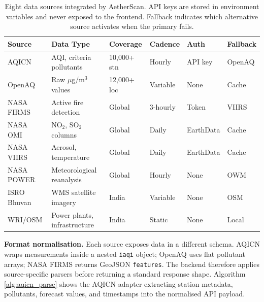 \documentclass[12pt,a4paper]{article}
\begin{document}
\begin{table}[H]
\centering
\caption[Integrated data sources and operational characteristics]{%
Eight data sources integrated by AetherScan. API keys are stored in
environment variables and never exposed to the frontend. Fallback indicates
which alternative source activates when the primary fails.}
\label{tab:datasources}
\setlength{\tabcolsep}{4pt}
\begin{tabularx}{\textwidth}{@{}lXllll@{}}
\toprule
\textbf{Source} & \textbf{Data Type} & \textbf{Coverage} &
\textbf{Cadence} & \textbf{Auth} & \textbf{Fallback} \\
\midrule
AQICN       & AQI, criteria pollutants  & 10,000+ stn & Hourly   & API key & OpenAQ \\
OpenAQ      & Raw $\mu$g/m$^3$ values   & 12,000+ loc & Variable & None    & Cache  \\
NASA FIRMS  & Active fire detection     & Global      & 3-hourly & Token   & VIIRS  \\
NASA OMI    & NO$_2$, SO$_2$ columns    & Global      & Daily    & EarthData & Cache \\
NASA VIIRS  & Aerosol, temperature      & Global      & Daily    & EarthData & Cache \\
NASA POWER  & Meteorological reanalysis & Global      & Hourly   & None    & OWM   \\
ISRO Bhuvan & WMS satellite imagery     & India       & Variable & None    & OSM   \\
WRI/OSM     & Power plants, infrastructure & India    & Static   & None    & Local \\
\bottomrule
\end{tabularx}
\end{table}

\noindent\textbf{Format normalisation.}
Each source exposes data in a different schema. AQICN wraps measurements
inside a nested \texttt{iaqi} object; OpenAQ uses flat pollutant arrays; NASA
FIRMS returns GeoJSON \texttt{features}. The backend therefore applies
source-specific parsers before returning a standard response shape. Algorithm \ref{alg:aqicn_parse} shows the AQICN adapter extracting station metadata,
pollutants, forecast values, and timestamps into the normalised API payload.
\end{document}
